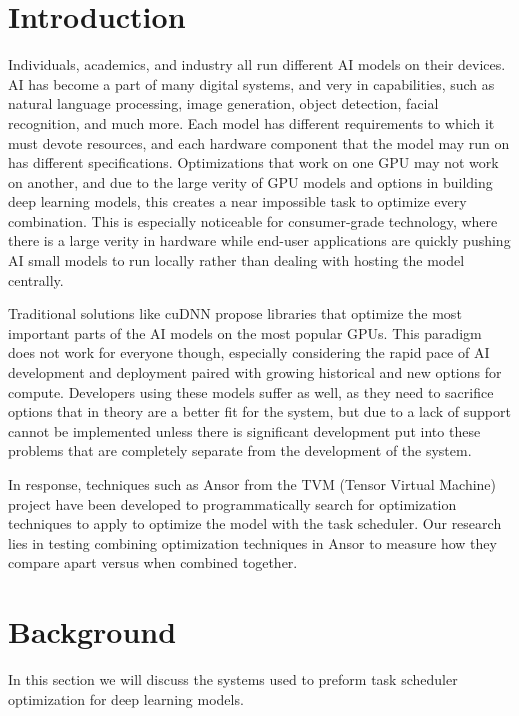 \documentclass[conference]{IEEEtran}
\begin{document}
\section{Introduction}
Individuals, academics, and industry all run different AI models on their devices.
AI has become a part of many digital systems, and very in capabilities, such as natural language processing, image generation, object detection, facial recognition, and much more. Each model has different requirements to which it must devote resources, and each hardware component that the model may run on has different specifications. Optimizations that work on one GPU may not work on another, and due to the large verity of GPU models and options in building deep learning models, this creates a near impossible task to optimize every combination. This is especially noticeable for consumer-grade technology, where there is a large verity in hardware while end-user applications are quickly pushing AI small models to run locally rather than dealing with hosting the model centrally.

Traditional solutions like cuDNN \cite{chetlur_cudnn_2014} propose libraries that optimize the most important parts of the AI models on the most popular GPUs. This paradigm does not work for everyone though, especially considering the rapid pace of AI development and deployment paired with growing historical and new options for compute. Developers using these models suffer as well, as they need to sacrifice options that in theory are a better fit for the system, but due to a lack of support cannot be implemented unless there is significant development put into these problems that are completely separate from the development of the system.

In response, techniques such as Ansor \cite{zheng_ansor_2023} from the TVM (Tensor Virtual Machine) \cite{chen_tvm_2018} project have been developed to programmatically search for optimization techniques to apply to optimize the model with the task scheduler. Our research lies in testing combining optimization techniques in Ansor to measure how they compare apart versus when combined together. 

\section{Background}
In this section we will discuss the systems used to preform task scheduler optimization for deep learning models.
\end{document}
